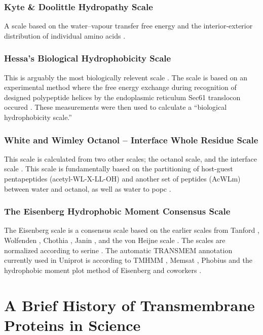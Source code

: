 
\subsubsection{Kyte \& Doolittle Hydropathy Scale}
A scale based on the water\---vapour transfer free energy and the interior-exterior distribution of individual amino acids \cite{Kyte1982}.

\subsubsection{Hessa's Biological Hydrophobicity Scale}
This is arguably the most biologically relevent scale \cite{Peters2014}. The scale is based on an experimental method where the free energy exchange during recognition of designed polypeptide helices by the endoplasmic reticulum Sec61 translocon occured \cite{Hessa2005}. These measurements were then used to calculate a “biological hydrophobicity scale.”

\subsubsection{White and Wimley Octanol \--- Interface Whole Residue Scale}
This scale is calculated from two other scales; the octanol scale, and the interface scale \cite{White1999}. This scale is fundamentally based on the partitioning of host-guest pentapeptides (acetyl-WL-X-LL-OH) and another set of peptides (AcWLm) between water and octanol, as well as water to \gls{popc} .


\subsubsection{The Eisenberg Hydrophobic Moment Consensus Scale}
The Eisenberg scale is a consensus scale based on the earlier scales from Tanford \cite{Nozaki1971}, Wolfenden \cite{Rose1993}, Chothia \cite{Chothia1976}, Janin \cite{Janin1979}, and the von Heijne scale \cite{VonHeijne1979}. The scales are normalized according to serine \cite{Eisenberg1984}. The automatic TRANSMEM annotation currently used in Uniprot is according to TMHMM \cite{Krogh2001}, Memsat \cite{Jones2007}, Phobius \cite{Kall2004} and the hydrophobic moment plot method of Eisenberg and coworkers \cite{Eisenberg1984}.


\section{A Brief History of Transmembrane Proteins in Science}
